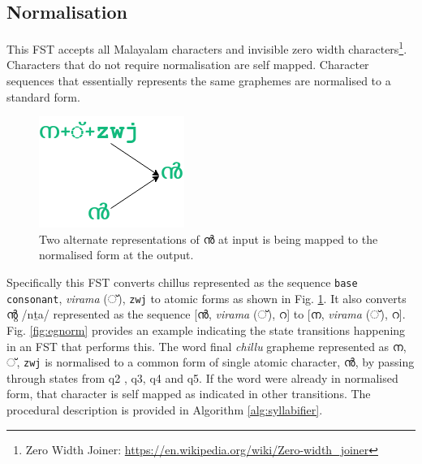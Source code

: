 
\subsection{Normalisation}
\label{normalisation}

This FST accepts all Malayalam characters and invisible zero width
characters\footnote{Zero Width Joiner:
	\url{https://en.wikipedia.org/wiki/Zero-width_joiner}}. Characters that do not
require normalisation are self mapped. Character sequences that essentially
represents the same graphemes are normalised to a standard form.

\begin{figure}[htpb]
	\centering
	\includegraphics[width=0.25\linewidth]{norm.drawio.png}
	\caption{Two alternate representations of {\mal ൻ} at input is being mapped to the normalised form at the output.}
	\label{fig:norm}
\end{figure}

Specifically this FST converts chillus represented as the sequence \texttt{base
	consonant}, \textit{virama} ({\mal ്}), \texttt{zwj} to atomic forms as shown in Fig. \ref{fig:norm}. It also converts {\mal ന്റ} {\ipa /nṯa/} represented as the sequence [{\mal ൻ},
\textit{virama} ({\mal ്}), {\mal റ}] to [{\mal ന}, \textit{virama} ({\mal ്}),
{\mal റ}]. Fig. \ref{fig:egnorm} provides an example indicating the state
transitions happening in an FST that performs this.  The word final \textit{chillu} grapheme represented as {\mal ന, ്,} \texttt{zwj} is normalised to a common form of single atomic character, {\mal ൻ},  by passing through states from q2 , q3, q4 and q5. If the word were already in normalised form, that character is self mapped as indicated in other transitions. The procedural description is provided in Algorithm \ref{alg:syllabifier}.


